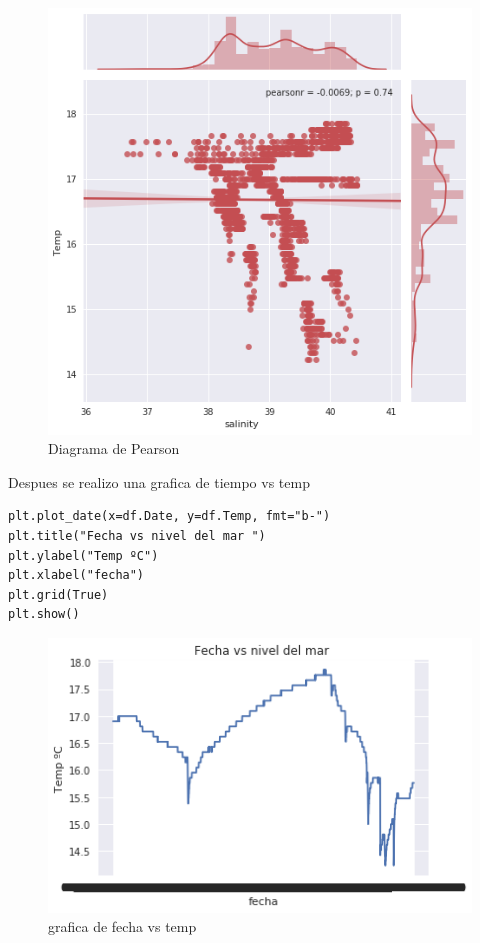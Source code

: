 \documentclass{article}
\begin{document}
\begin{figure}[h]
\centering
\includegraphics[scale=0.5]{pearson3.png}
\caption{Diagrama de Pearson}
\end{figure}


Despues se realizo una grafica de tiempo vs temp
\begin{verbatim}
plt.plot_date(x=df.Date, y=df.Temp, fmt="b-")
plt.title("Fecha vs nivel del mar ")
plt.ylabel("Temp ºC")
plt.xlabel("fecha")
plt.grid(True)
plt.show()
\end{verbatim}

\begin{figure}[h]
\centering
\includegraphics[scale]{fecha.png}
\caption{grafica de fecha vs temp}
\end{figure}
\end{document}

